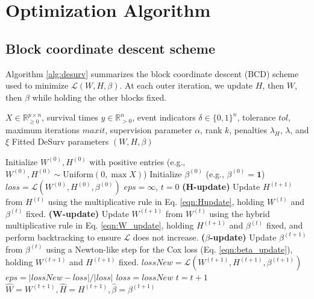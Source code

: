 \documentclass[
]{article}
\begin{document}
\section{Optimization Algorithm}

\subsection{Block coordinate descent scheme}

Algorithm \ref{alg:desurv} summarizes the block coordinate descent (BCD)
scheme used to minimize \(\mathcal{L}(W,H,\beta)\). At each outer
iteration, we update \(H\), then \(W\), then \(\beta\) while holding the
other blocks fixed.

\begin{algorithm}[htbp]
\caption{DeSurv block coordinate descent}
\label{alg:desurv}
    \begin{algorithmic}[1]
        \Require $X \in \mathbb{R}_{\geq 0}^{p \times n}$, survival times $y \in \mathbb{R}^n_{> 0}$, event indicators $\delta \in \{0,1\}^{n}$, tolerance $tol$, maximum iterations $maxit$, supervision parameter $\alpha$, rank $k$, penalties $\lambda_H$, $\lambda$, and $\xi$
        \Ensure Fitted DeSurv parameters $(W,H,\beta)$

        \State Initialize $W^{(0)}, H^{(0)}$ with positive entries (e.g., $W^{(0)},H^{(0)} \sim \mathrm{Uniform}(0,\max X)$)
        \State Initialize $\beta^{(0)}$ (e.g., $\beta^{(0)} = \mathbf{1}$)
        \State $loss = \mathcal{L}(W^{(0)},H^{(0)},\beta^{(0)})$
        \State $eps = \infty$, $t = 0$
            \State \textbf{(H-update)}
            \State \hspace{0.5cm} Update $H^{(t+1)}$ from $H^{(t)}$ using the multiplicative rule in Eq. \ref{eqn:Hupdate},
            \State \hspace{0.5cm} holding $W^{(t)}$ and $\beta^{(t)}$ fixed.
            \State \textbf{(W-update)}
            \State \hspace{0.5cm} Update $W^{(t+1)}$ from $W^{(t)}$ using the hybrid multiplicative rule in Eq. \ref{eqn:W_update},
            \State \hspace{0.5cm} holding $H^{(t+1)}$ and $\beta^{(t)}$ fixed, and perform backtracking to ensure
            \State \hspace{0.5cm} $\mathcal{L}$ does not increase.
            \State \textbf{($\beta$-update)}
            \State \hspace{0.5cm} Update $\beta^{(t+1)}$ from $\beta^{(t)}$ using a Newton-like step for the Cox loss
            \State \hspace{0.5cm} (Eq. \ref{eqn:beta_update}), holding $W^{(t+1)}$ and $H^{(t+1)}$ fixed.
            \State $lossNew = \mathcal{L}(W^{(t+1)},H^{(t+1)},\beta^{(t+1)})$
            \State $eps = |lossNew - loss| / |loss|$
            \State $loss = lossNew$
            \State $t = t + 1$
        \EndWhile
        \State \Return $\hat{W} = W^{(t+1)}, \hat{H} = H^{(t+1)}, \hat{\beta}=\beta^{(t+1)}$
    \end{algorithmic}
\end{algorithm}
\end{document}
